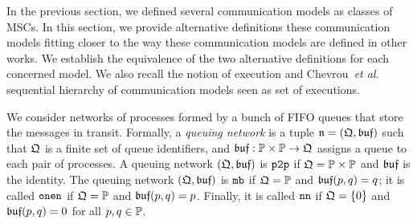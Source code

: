 
In the previous section, we defined several communication models
as classes of MSCs. 
In this section, we provide alternative definitions these 
communication models
fitting closer to the way these communication models are defined in other works. We establish the equivalence
of the two alternative definitions for each concerned model. We also recall the notion of
execution and Chevrou~\emph{et al.} sequential hierarchy of communication models seen as set of
executions.


We consider networks of processes formed by a bunch of FIFO queues that store the messages in transit.
Formally, a \emph{queuing network} is a tuple $\mathfrak{n}=(\mathfrak{Q},\mathfrak{buf})$ such that
$\mathfrak{Q}$ is a finite set of queue identifiers, and
$\mathfrak{buf}:\mathbb{P}\times\mathbb{P}\to \mathfrak{Q}$ assigns a queue to each
pair of processes.
A queuing network $(\mathfrak{Q},\mathfrak{buf})$ is $\mathtt{p2p}$ if
$\mathfrak{Q}=\mathbb{P}\times\mathbb{P}$ and $\mathfrak{buf}$ is the identity.
The queuing network $(\mathfrak{Q},\mathfrak{buf})$ is $\mathtt{mb}$ if
$\mathfrak{Q}=\mathbb{P}$ and $\mathfrak{buf}(p,q)=q$; it is called $\mathtt{onen}$ if
$\mathfrak{Q}=\mathbb{P}$ and $\mathfrak{buf}(p,q)=p$. Finally, it is called
$\mathtt{nn}$ if $\mathfrak{Q}=\{0\}$ and $\mathfrak{buf}(p,q)=0$ for all $p,q\in\mathbb{P}$.

